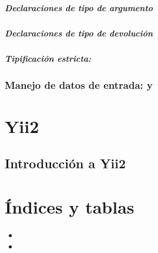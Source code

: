 \documentclass[a4paper,11pt,spanish]{sphinxmanual}
\begin{document}
\subsubsection{Declaraciones de tipo de argumento}
\label{\detokenize{php:declaraciones-de-tipo-de-argumento}}

\subsubsection{Declaraciones de tipo de devolución}
\label{\detokenize{php:declaraciones-de-tipo-de-devolucion}}

\subsubsection{Tipificación estricta: }
\label{\detokenize{php:tipificacion-estricta-declare-strict-types-1}}

\section{Manejo de datos de entrada:  y }
\label{\detokenize{php:manejo-de-datos-de-entrada-get-y-post}}

\part{Yii2}
\label{\detokenize{yii2:yii2}}\label{\detokenize{yii2::doc}}

\chapter{Introducción a Yii2}
\label{\detokenize{yii2:introduccion-a-yii2}}

\part{Índices y tablas}
\label{\detokenize{index:indices-y-tablas}}\begin{itemize}
\item {} 

\item {} 

\end{itemize}



\renewcommand{\indexname}{Índice}
\printindex
\end{document}
